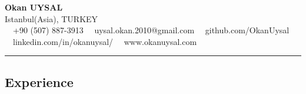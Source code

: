 \documentclass[11pt,letterpaper]{article}
\begin{document}
\begin{center}
	{\LARGE \textbf{Okan UYSAL}}\\
	Istanbul(Asia), TURKEY
	\vspace{0.04cm}
	\\
	\raisebox{-0.2\height} {\Large \faPhoneSquare} \ \  +90 (507) 887-3913 \hfill\raisebox{-0.2\height}{\Large \faEnvelopeSquare} \ \ uysal.okan.2010@gmail.com \hfill \raisebox{-0.2\height}{\Large \faGithubSquare} \ \ github.com/OkanUysal 
	\\
	\raisebox{-0.2\height}{\Large \faLinkedinSquare} \ \ linkedin.com/in/okanuysal/ \raisebox{-0.2\height}{\Large \faGlobe} \ \ www.okanuysal.com
\end{center}


\hrule
\vspace{-1em}
\subsection*{\Large Experience}
\end{document}
